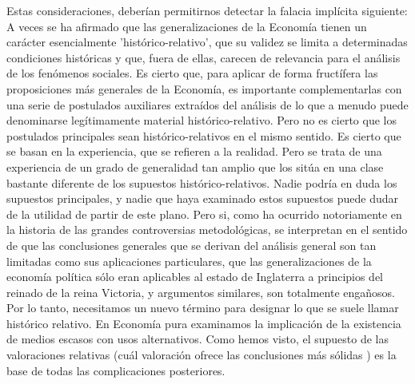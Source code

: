  Estas consideraciones, deberían permitirnos detectar la falacia implícita siguiente: A veces se ha afirmado que las generalizaciones de la Economía tienen un carácter esencialmente 'histórico-relativo', que su validez se limita a determinadas condiciones históricas y que, fuera de ellas, carecen de relevancia para el análisis de los fenómenos sociales. Es cierto que, para aplicar de forma fructífera las proposiciones más generales de la Economía, es importante complementarlas con una serie de postulados auxiliares extraídos del análisis de lo que a menudo puede denominarse legítimamente material histórico-relativo. Pero no es cierto que los postulados principales sean histórico-relativos en el mismo sentido. Es cierto que se basan en la experiencia, que se refieren a la realidad. Pero se trata de una experiencia de un grado de generalidad tan amplio que los sitúa en una clase bastante diferente de los supuestos histórico-relativos. Nadie podría en duda los supuestos principales, y nadie que haya examinado estos supuestos puede dudar de la utilidad de partir de este plano. Pero si, como ha ocurrido notoriamente en la historia de las grandes controversias metodológicas, se interpretan en el sentido de que las conclusiones generales que se derivan del análisis general son tan limitadas como sus aplicaciones particulares, que las generalizaciones de la economía política sólo eran aplicables al estado de Inglaterra a principios del reinado de la reina Victoria, y argumentos similares, son totalmente engañosos. Por lo tanto, necesitamos un nuevo término para designar lo que se suele llamar histórico relativo. En Economía pura examinamos la implicación de la existencia de medios escasos con usos alternativos. Como hemos visto, el supuesto de las valoraciones relativas (cuál valoración ofrece las conclusiones más sólidas ) es la base de todas las complicaciones posteriores. \\

